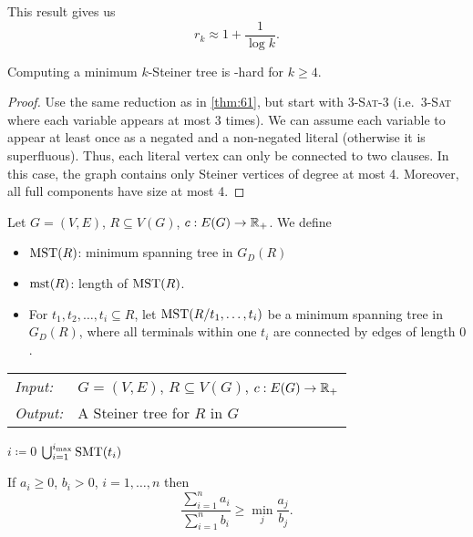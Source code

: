 \documentclass[../skript.tex]{subfiles}
\begin{document}
This result gives us
\[
	r_k \approx 1 + \frac{1}{\log k}.
\]
\begin{theorem} %
\label{thm:74}
Computing a minimum $k$-Steiner tree is \NP-hard for $k \geq 4$.
\end{theorem}
\begin{proof}
Use the same reduction as in \cref{thm:61}, but start with 3-\textsc{Sat}-3 (i.e.\ 3-\textsc{Sat} where each variable appears at most 3 times). We can assume each variable to appear at least once as a negated and a non-negated literal (otherwise it is superfluous). Thus, each literal vertex can only be connected to two clauses. In this case, the graph contains only Steiner vertices of degree at most 4. Moreover, all full components have size at most 4.
\end{proof}
Let $G = (V, E)$, $R \subseteq V(G)$, $c : E(G) \to \mathbb{R}_+$. We define
\begin{itemize}
\item $\operatorname{MST}(R)$: minimum spanning tree in $G_D(R)$
\item $\operatorname{mst}(R)$: length of $\operatorname{MST}(R)$.
\item For $t_1, t_2, \ldots, t_i \subseteq R$, let $\operatorname{MST}(R/t_1, \ldots, t_i)$ be a minimum spanning tree in $G_D(R)$, where all terminals within one $t_i$ are connected by edges of length $0$.
\end{itemize}
\begin{algorithmbox}
\begin{tabular}{@{}ll}
\textit{Input:} & $G = (V, E)$, $R \subseteq V(G)$, $c : E(G) \to \mathbb{R}_+$\\
\textit{Output:} & A Steiner tree for $R$ in $G$
\end{tabular}
\end{algorithmbox}
\vspace{-7pt}
\begin{algorithm}[H]
$i \coloneqq 0$\;
\Return $\bigcup_{i=1}^{i_{\max}} \operatorname{SMT}(t_i)$\;
\end{algorithm}
\vspace{-7pt}
\EndAlgorithmLine
\begin{proposition} %
\label{thm:75}
If $a_i \geq 0$, $b_i > 0$, $i = 1, \ldots, n$ then
\[
	\frac{\sum_{i=1}^n a_i}{\sum_{i=1}^n b_i} \geq \min_j \frac{a_j}{b_j}.
\]
\end{proposition}
\end{document}
